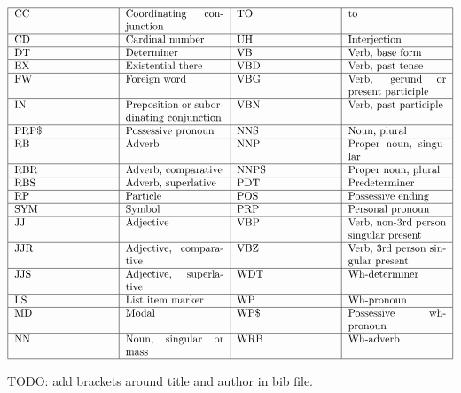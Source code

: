 \documentclass[12pt]{article}
\begin{document}
$$
\begin{tabular}{ |p{3.25cm}|p{3.25cm}|p{3.25cm}|p{3.25cm}| }
\hline
	CC & Coordinating\ conjunction & TO & to \\ \hline
	CD & Cardinal\ number & UH & Interjection \\ \hline
	DT & Determiner & VB & Verb, base\ form \\ \hline
	EX & Existential\ there & VBD & Verb, past\ tense \\ \hline
	FW & Foreign\ word & VBG & Verb, gerund\ or\ present\ participle \\ \hline
	IN & Preposition\ or\ subordinating conjunction & VBN & Verb, past\ participle \\ \hline
	PRP\$ & Possessive\ pronoun & NNS & Noun,\ plural \\ \hline
	RB & Adverb & NNP & Proper\ noun,\ singular \\ \hline
	RBR & Adverb,\ comparative & NNPS & Proper\ noun, plural \\ \hline
	RBS & Adverb,\ superlative & PDT & Predeterminer \\ \hline
	RP & Particle & POS & Possessive\ ending \\ \hline
	SYM & Symbol & PRP & Personal\ pronoun \\ \hline
	JJ & Adjective & VBP & Verb, non-3rd\ person\ singular\ present \\ \hline
	JJR & Adjective, comparative & VBZ & Verb, 3rd\ person\ singular\ present \\ \hline
	JJS & Adjective,\ superlative & WDT & Wh-determiner \\ \hline
	LS & List\ item\ marker & WP & Wh-pronoun \\ \hline
	MD & Modal & WP\$ & Possessive\ wh-pronoun \\ \hline
	NN & Noun,\ singular\ or\ mass & WRB & Wh-adverb \\ \hline
\end{tabular}
$$

\newpage
TODO: add brackets around title and author in bib file.

\end{document}
